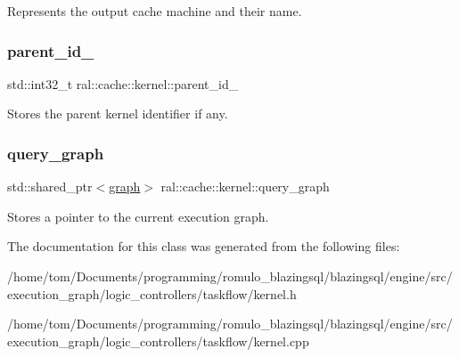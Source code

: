 Represents the output cache machine and their name. \mbox{\label{classral_1_1cache_1_1kernel_ad1b8b87c5008b3bce16fe45da84eccdd}} 
\subsubsection{\texorpdfstring{parent\+\_\+id\+\_\+}{parent\_id\_}}
{\footnotesize\ttfamily std\+::int32\+\_\+t ral\+::cache\+::kernel\+::parent\+\_\+id\+\_\+}

Stores the parent kernel identifier if any. \mbox{\label{classral_1_1cache_1_1kernel_a5fbb02292aff165a28ef25e75f0d89bd}} 
\subsubsection{\texorpdfstring{query\+\_\+graph}{query\_graph}}
{\footnotesize\ttfamily std\+::shared\+\_\+ptr$<$\hyperlink{classral_1_1cache_1_1graph}{graph}$>$ ral\+::cache\+::kernel\+::query\+\_\+graph}

Stores a pointer to the current execution graph. 

The documentation for this class was generated from the following files\+:\begin{DoxyCompactItemize}
\item 
/home/tom/\+Documents/programming/romulo\+\_\+blazingsql/blazingsql/engine/src/execution\+\_\+graph/logic\+\_\+controllers/taskflow/kernel.\+h\item 
/home/tom/\+Documents/programming/romulo\+\_\+blazingsql/blazingsql/engine/src/execution\+\_\+graph/logic\+\_\+controllers/taskflow/kernel.\+cpp\end{DoxyCompactItemize}
